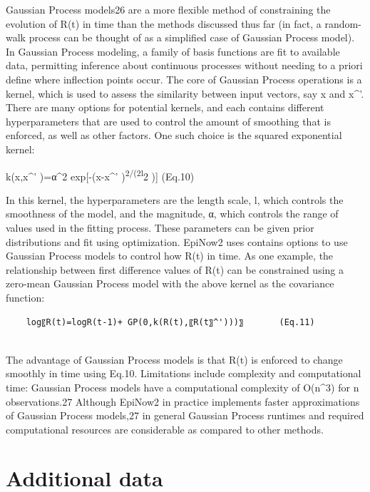 \documentclass[
  letterpaper,
  DIV=11,
  numbers=noendperiod]{scrreprt}
\begin{document}
Gaussian Process models26 are a more flexible method of constraining the
evolution of R(t) in time than the methods discussed thus far (in fact,
a random-walk process can be thought of as a simplified case of Gaussian
Process model). In Gaussian Process modeling, a family of basis
functions are fit to available data, permitting inference about
continuous processes without needing to a priori define where inflection
points occur. The core of Gaussian Process operations is a kernel, which
is used to assess the similarity between input vectors, say x and
x\^{}'. There are many options for potential kernels, and each contains
different hyperparameters that are used to control the amount of
smoothing that is enforced, as well as other factors. One such choice is
the squared exponential kernel:

k(x,x\^{}' )=α\^{}2 exp⁡{[}-(x-x\^{}' )\textsuperscript{2/(2l}2 ){]}
(Eq.10)

In this kernel, the hyperparameters are the length scale, l, which
controls the smoothness of the model, and the magnitude, α, which
controls the range of values used in the fitting process. These
parameters can be given prior distributions and fit using optimization.
EpiNow2 uses contains options to use Gaussian Process models to control
how R(t) in time. As one example, the relationship between first
difference values of R(t) can be constrained using a zero-mean Gaussian
Process model with the above kernel as the covariance function:

\begin{verbatim}
    log⁡〖R(t)=log⁡R(t-1)+ GP(0,k(R(t),〖R(t〗^')))〗       (Eq.11)
    
\end{verbatim}

The advantage of Gaussian Process models is that R(t) is enforced to
change smoothly in time using Eq.10. Limitations include complexity and
computational time: Gaussian Process models have a computational
complexity of O(n\^{}3) for n observations.27 Although EpiNow2 in
practice implements faster approximations of Gaussian Process models,27
in general Gaussian Process runtimes and required computational
resources are considerable as compared to other methods.

\chapter*{Additional data}\label{additional-data}
\end{document}
